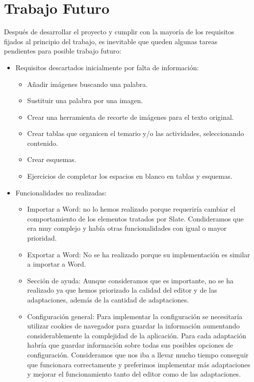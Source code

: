 \section{Trabajo Futuro}
\label{sec:TrabajoFuturo}
Después de desarrollar el proyecto y cumplir con la mayoría de los requisitos fijados al principio del trabajo, es inevitable que queden algunas tareas pendientes para posible trabajo futuro:

\begin{itemize}
    \item Requisitos descartados inicialmente por falta de información:
    \begin{itemize}
        \item Añadir imágenes buscando una palabra.
        \item Sustituir una palabra por una imagen.
        \item Crear una herramienta de recorte de imágenes para el texto original.
        \item Crear tablas que organicen el temario y/o las actividades, seleccionando contenido.
        \item Crear esquemas.
        \item Ejercicios de completar los espacios en blanco en tablas y esquemas.        
    \end{itemize}
    \item Funcionalidades no realizadas:
    \begin{itemize}
        \item Importar a Word: no lo hemos realizado porque requeriría cambiar el comportamiento de los elementos tratados por Slate. Condideramos que era muy complejo y había otras funcionalidades con igual o mayor prioridad.
        \item Exportar a Word: No se ha realizado porque su implementación es similar a importar a Word.      
        \item Sección de ayuda: Aunque consideramos que es importante, no se ha realizado ya que hemos priorizado la calidad del editor y de las adaptaciones, además de la cantidad de adaptaciones.
        \item Configuración general: Para implementar la configuración se necesitaría utilizar cookies de navegador para guardar la información aumentando considerablemente la complejidad de la aplicación. Para cada adaptación habría que guardar información sobre todas sus posibles opciones de configuración. Consideramos que nos iba a llevar mucho tiempo conseguir que funcionara correctamente y preferimos implementar más adaptaciones y mejorar el funcionamiento tanto del editor como de las adaptaciones.
    \end{itemize}
\end{itemize}


